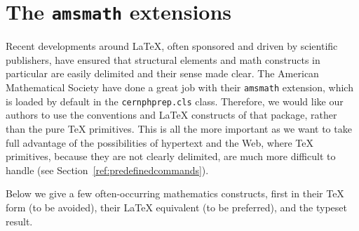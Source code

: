 \documentclass{cernphprep}
\begin{document}
\section{The \texttt{amsmath} extensions}
\label{app:amsmath}

Recent developments around \LaTeX{}, often sponsored and driven by
scientific publishers, have ensured that structural elements and math
constructs in particular are easily delimited and their sense made
clear. The American Mathematical Society have done a great job with
their \texttt{amsmath} extension, which is loaded by default in the
\texttt{cernphprep.cls} class. Therefore, we would like our authors to
use the conventions and \LaTeX{} constructs of that package, rather
than the pure \TeX{} primitives. This is all the more important as we
want to take full advantage of the possibilities of hypertext and the
Web, where \TeX{} primitives, because they are not clearly delimited,
are much more difficult to handle (see Section~\ref{ref:predefinedcommands}).

Below we give a few often-occurring mathematics constructs, first in
their \TeX{} form (to be avoided), their \LaTeX{} equivalent (to be
preferred), and the typeset result.
\end{document}
